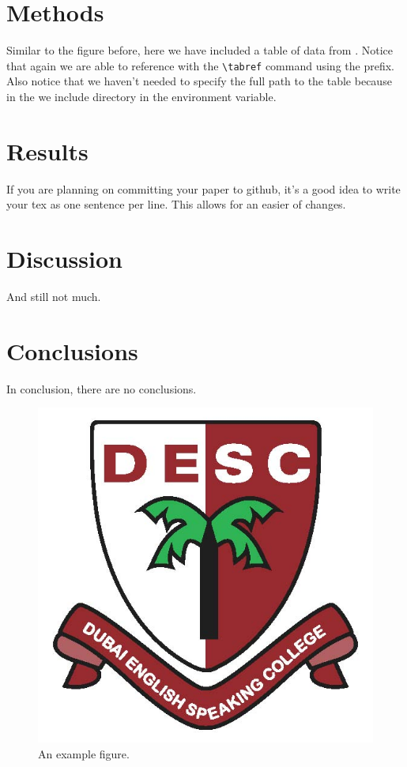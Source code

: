 \documentclass[\docopts]{\docclass}
\begin{document}
\section{Methods}
\label{sec:methods}

Similar to the figure before, here we have included a table of data from .  
Notice that again we are able to reference  with the \verb=\tabref= command using the  prefix. 
Also notice that we haven't needed to specify the full path to the table because in the  we include  directory in the  environment variable.



\section{Results}
\label{sec:results}

If you are planning on committing your paper to github, it's a good idea to write your tex as one sentence per line. 
This allows for an easier  of changes.

\section{Discussion}
\label{sec:discussion}

And still not much.

\section{Conclusions}
\label{sec:conclusions}

In conclusion, there are no conclusions.

\begin{figure}
\includegraphics[width=\columnwidth]{example.jpg}
\caption{An example figure. \label{fig:example}}
\end{figure}





\end{document}
